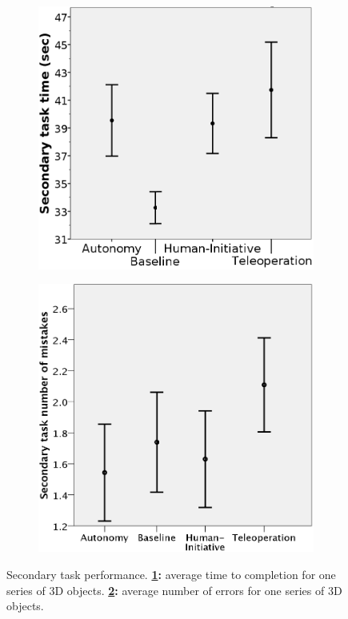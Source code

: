 \documentclass[a4paper,12pt,oneside,openright]{bhamthesis}
\begin{document}
	\begin{figure}
		\centering
		\begin{subfigure}[b]{0.49\textwidth}
			\centering
			\includegraphics[width=\textwidth]{chapter4_fig/secondary_time.png}
			\caption{}
			\label{subfig:secondary_time_exp2}
		\end{subfigure}
		\hfill
		\begin{subfigure}[b]{0.49\textwidth}
			\centering
			\includegraphics[width=\textwidth]{chapter4_fig/secondary_mistakes.png}
			\caption{}
			\label{subfig:secondary_mistakes_exp2}
		\end{subfigure}
		\hfill
		\caption{Secondary task performance. \textbf{\ref{subfig:secondary_time_exp2}:} average time to completion for one series of 3D objects. \textbf{\ref{subfig:secondary_mistakes_exp2}:} average number of errors for one series of 3D objects.}
		\label{fig:rt_exp2}
	\end{figure}
\end{document}

